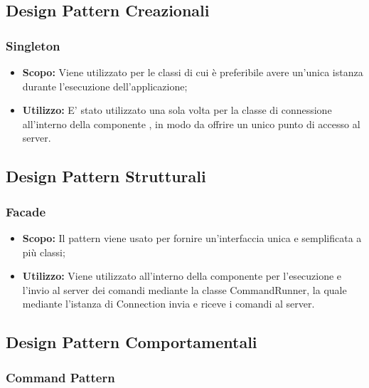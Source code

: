 \documentclass{scalatekids-article}
\begin{document}
\subsection{Design Pattern Creazionali}

\subsubsection{Singleton}

\begin{itemize}
\item \textbf{Scopo:} Viene utilizzato per le classi di cui è preferibile avere un'unica istanza
  durante l'esecuzione dell'applicazione;
\item \textbf{Utilizzo:} E' stato utilizzato una sola volta per la classe di connessione all'interno
  della componente , in modo da offrire un unico punto di accesso al server.
\end{itemize}

\subsection{Design Pattern Strutturali}

\subsubsection{Facade}

\begin{itemize}
\item \textbf{Scopo:} Il pattern  viene usato per fornire
  un'interfaccia unica e semplificata a più classi;
\item \textbf{Utilizzo:} Viene utilizzato all'interno della componente
   per l'esecuzione e l'invio al server dei comandi mediante
  la classe CommandRunner, la quale mediante l'istanza  di
  Connection invia e riceve i comandi al server.
\end{itemize}

\subsection{Design Pattern Comportamentali}

\subsubsection{Command Pattern}

\label{sec:CommandPattern}
\end{document}
